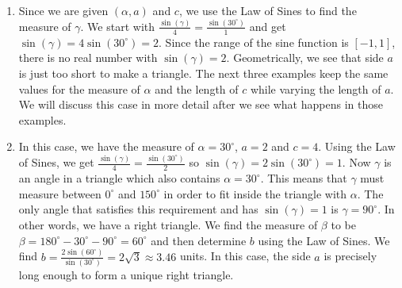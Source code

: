 {\begin{enumerate}

\item  Since we are given $(\alpha,a)$ and $c$, we use the Law of Sines to find the measure of $\gamma$.  We start with $\frac{\sin(\gamma)}{4} = \frac{\sin\left(30^{\circ}\right)}{1}$ and get $\sin(\gamma) = 4 \sin\left(30^{\circ}\right) = 2$.  Since the range of the sine function is $[-1,1]$, there is no real number with $\sin(\gamma) = 2$.  Geometrically, we see that side $a$ is just too short to make a triangle.  The next three examples keep the same values for the measure of $\alpha$ and the length of $c$ while varying the length of $a$.  We will discuss this case in more detail after we see what happens in those examples.


\item  In this case, we have the measure of $\alpha = 30^{\circ}$, $a = 2$ and $c=4$.  Using the Law of Sines, we get  $\frac{\sin(\gamma)}{4} = \frac{\sin\left(30^{\circ}\right)}{2}$ so $\sin(\gamma) = 2 \sin\left(30^{\circ}\right) = 1$.  Now $\gamma$ is an angle in a triangle which also contains $\alpha = 30^{\circ}$.  This means that $\gamma$ must measure between $0^{\circ}$ and $150^{\circ}$ in order to fit inside the triangle with $\alpha$.   The only angle that satisfies this requirement and has $\sin(\gamma) = 1$ is  $\gamma = 90^{\circ}$.  In other words, we have a right triangle.  We find the measure of $\beta$ to be  $\beta = 180^{\circ} - 30^{\circ} - 90^{\circ} = 60^{\circ}$ and then determine $b$ using the Law of Sines.  We find $b = \frac{2 \sin\left(60^{\circ}\right)}{\sin\left(30^{\circ}\right)} = 2 \sqrt{3} \approx 3.46$ units.  In this case, the side $a$ is precisely long enough to form a unique right triangle.

\drawexampleline





\end{enumerate}}

